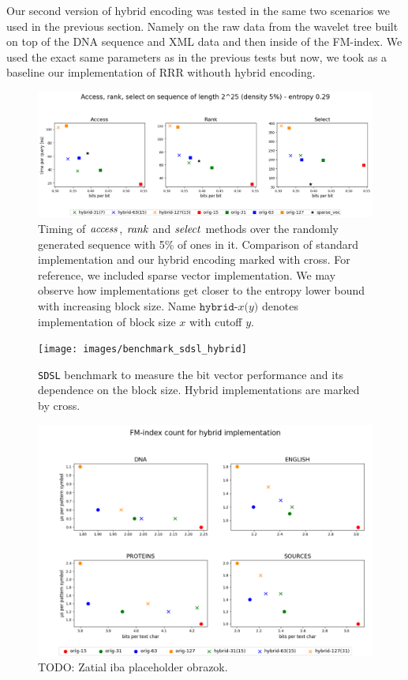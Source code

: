 Our second version of hybrid encoding was tested in the same two scenarios we used in the previous section. Namely
on the raw data from the wavelet tree built on top of the DNA sequence and XML data and then inside of the FM-index.
We used the exact same parameters as in the previous tests but now, we took as a baseline our implementation of RRR
withouth hybrid encoding. 

\begin{figure}
	\centerline{
		\includegraphics[width=\textwidth, height=0.27\textheight]{images/vysledky_hybrid_artif}
	}
	\caption[TODO]{Timing of $\mathit{access}$, $\mathit{rank}$ and $\mathit{select}$ methods over the randomly generated
	sequence with 5\% of ones in it. Comparison of standard implementation and our hybrid encoding
	marked with cross. For reference, we included sparse vector implementation. We may observe how
	implementations get closer to the entropy lower bound with increasing block size. Name
	$\texttt{hybrid-}x\texttt{(}y\texttt{)}$ denotes implementation of block size $x$ with cutoff $y$.
	}
	\label{obr:vysledky_hybrid_artif}
\end{figure}

\begin{figure}
	\centerline{
		\texttt{[image: images/benchmark\_sdsl\_hybrid]}
	}
	\caption[TODO]{\texttt{SDSL} benchmark to measure the bit vector performance and its dependence
	on the block size. Hybrid implementations are marked by cross.
	}
	\label{obr:benchmark_sdsl_hybrid}
\end{figure}

\begin{figure}
	\centerline{
		\includegraphics[width=\textwidth, height=0.5\textheight]{images/vysledky_sdsl_hybrid_count}
	}
	\caption[TODO]{TODO: Zatial iba placeholder obrazok.
	}
	\label{obr:benchmark_sdsl_hybrid_count}
\end{figure}

